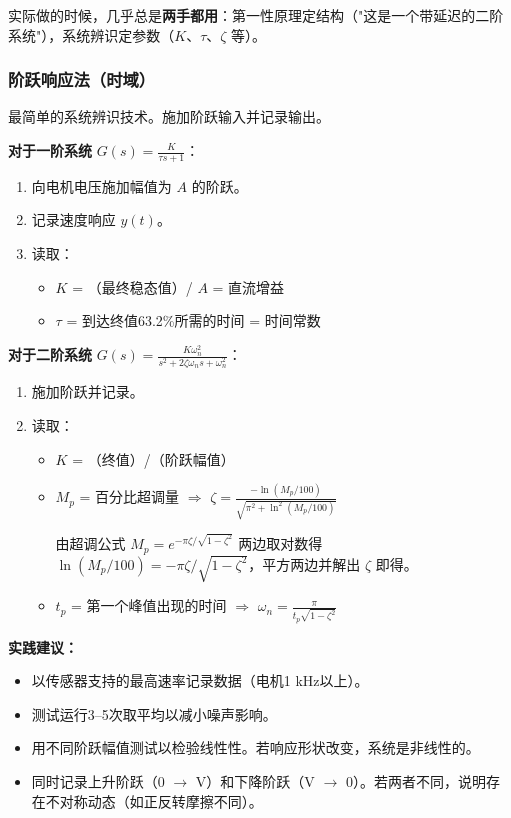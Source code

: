 实际做的时候，几乎总是\textbf{两手都用}：第一性原理定结构（"这是一个带延迟的二阶系统"），系统辨识定参数（$K$、$\tau$、$\zeta$ 等）。

\subsubsection{阶跃响应法（时域）}

最简单的系统辨识技术。施加阶跃输入并记录输出。

\textbf{对于一阶系统} $G(s) = \frac{K}{\tau s + 1}$：
\begin{enumerate}
    \item 向电机电压施加幅值为 $A$ 的阶跃。
    \item 记录速度响应 $y(t)$。
    \item 读取：
    \begin{itemize}[nosep]
        \item $K$ = （最终稳态值）/ $A$ = 直流增益
        \item $\tau$ = 到达终值63.2\%所需的时间 = 时间常数
    \end{itemize}
\end{enumerate}

\textbf{对于二阶系统} $G(s) = \frac{K\omega_n^2}{s^2 + 2\zeta\omega_n s + \omega_n^2}$：
\begin{enumerate}
    \item 施加阶跃并记录。
    \item 读取：
    \begin{itemize}[nosep]
        \item $K$ = （终值）/（阶跃幅值）
        \item $M_p$ = 百分比超调量 $\Rightarrow$ $\zeta = \frac{-\ln(M_p/100)}{\sqrt{\pi^2 + \ln^2(M_p/100)}}$

        由超调公式 $M_p = e^{-\pi\zeta/\sqrt{1-\zeta^2}}$ 两边取对数得 $\ln(M_p/100) = -\pi\zeta/\sqrt{1-\zeta^2}$，平方两边并解出 $\zeta$ 即得。
        \item $t_p$ = 第一个峰值出现的时间 $\Rightarrow$ $\omega_n = \frac{\pi}{t_p \sqrt{1 - \zeta^2}}$
    \end{itemize}
\end{enumerate}

\textbf{实践建议：}
\begin{itemize}
    \item 以传感器支持的最高速率记录数据（电机1 kHz以上）。
    \item 测试运行3--5次取平均以减小噪声影响。
    \item 用不同阶跃幅值测试以检验线性性。若响应形状改变，系统是非线性的。
    \item 同时记录上升阶跃（0 $\to$ V）和下降阶跃（V $\to$ 0）。若两者不同，说明存在不对称动态（如正反转摩擦不同）。
\end{itemize}


